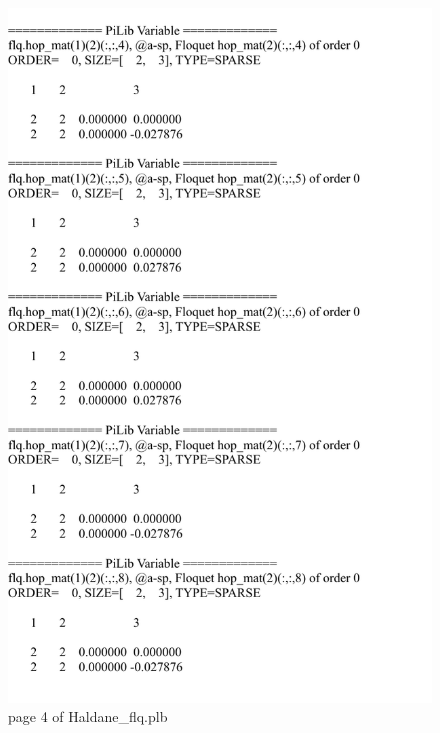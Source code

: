 \documentclass[10pt,a4paper]{article}
\begin{document}
\begin{figure}[tbp]
\centering
\includegraphics[width=0.85\columnwidth]{Haldane_flq_p4.pdf}
\caption{page 4 of Haldane\_flq.plb}
\end{figure}
\end{document}
